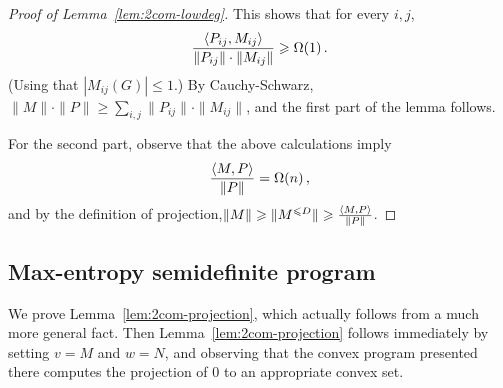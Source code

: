\begin{proof}[Proof of Lemma~\ref{lem:2com-lowdeg}]
  This shows that for every $i,j$,
  \[
    \frac{\langle P_{ij}, M_{ij}\rangle}{\|P_{ij}\|\cdot \|M_{ij}\|} \geqslant \Omega(1)\,.
  \]
(Using that $|M_{ij}(G)| \leq 1$.)
  By Cauchy-Schwarz, $\|M\| \cdot \|P\| \geq \sum_{i,j} \|P_{ij}\| \cdot \|M_{ij}\|$, and the first part of the lemma follows.

  For the second part, observe that the above calculations imply
  \[
    \frac{\langle M,P\rangle}{\|P\|} = \Omega(n)\,,
  \]
and by the definition of projection,$\|M\| \geqslant \|M^{\leqslant D}\| \geqslant \tfrac{\langle M,P\rangle}{\|P\|}$.
\end{proof}

\subsection{Max-entropy semidefinite program}
We prove Lemma~\ref{lem:2com-projection}, which actually follows from a much more general fact.
\Snote{}
Then Lemma~\ref{lem:2com-projection} follows immediately by setting $v = M$ and $w = N$, and observing that the convex program presented there computes the projection of $0$ to an appropriate convex set.
\fi